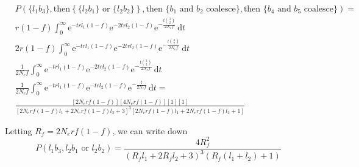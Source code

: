 \documentclass[reqno]{amsart}
\begin{document}
\begin{align}
& P(\{l_1 b_3\}, \text{then} \left\{\{l_2 b_1\} \text{ or } \{l_2 b_2\}\right\}, \text{then } \{b_1\text{ and } b_2 \text{ coalesce}\}, \text{then } \{b_4 \text{ and } b_5 \text{ coalesce}\})  = \\
& r(1-f)\int_0^\infty \mathrm{e}^{-t r l_1 ( 1-f )} \mathrm{e}^{ -2 t r l_2 ( 1-f ) } \mathrm{e}^{-\frac{t\binom{3}{2}}{2 N_e f}}\, \mathrm{d}t \\
	& 2 r (1-f) \int_0^\infty \mathrm{e}^{-t r l_1 ( 1-f )} \mathrm{e}^{ -2 t r l_2 ( 1-f ) } \mathrm{e}^{-\frac{t\binom{3}{2}}{2 N_e f}}\, \mathrm{d}t \\ 
	& \frac{1}{2 N_e f}\int_0^\infty \mathrm{e}^{-t r l_1 ( 1-f )} \mathrm{e}^{ -2 t r l_2 ( 1-f ) } \mathrm{e}^{-\frac{t\binom{3}{2}}{2 N_e f}}\, \mathrm{d}t \\
	& \frac{1}{2 N_e f}\int_0^\infty \mathrm{e}^{-t r l_1 ( 1-f )} \mathrm{e}^{ - t r l_2 ( 1-f ) } \mathrm{e}^{-\frac{t}{2 N_e f}}\, \mathrm{d}t = \\
	& \frac{\left[2N_erf(1-f)\right]\left[4N_erf(1-f)\right]\left[1\right]\left[1\right]}{\left[2N_erf(1-f)l_1 + 2N_erf(1-f)l_2+3\right]^3\left[2N_erf(1-f)l_1 + 2N_erf(1-f)l_2 + 1\right]}
\end{align}

Letting $R_f = 2N_erf(1-f)$, we can write down
\begin{equation}
P(l_1b_3,l_2b_1 \text{ or } l_2b_2) = \frac{4R_f^2}{\left(R_f l_1 + 2R_f l_2 + 3\right)^3\left(R_f\left(l_1 + l_2\right) + 1 \right)}
\end{equation}
\end{document}
